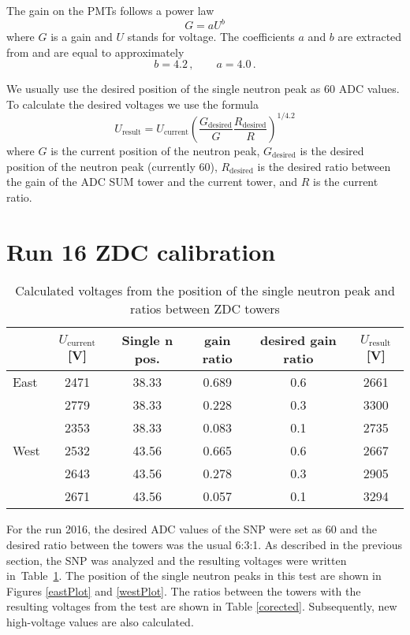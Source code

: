 The gain on the PMTs follows a power law
\begin{equation}
G = aU^b
\end{equation}
where $G$ is a gain and $U$ stands for voltage. The coefficients $a$ and $b$ are 
extracted from \cite{ZDCvoltsDependence}
and are equal to approximately
\begin{equation}
b=4.2\,, \qquad a=4.0\,.
\end{equation}

We usually use the desired position of the single neutron peak as 60 ADC values. To calculate
the desired voltages we use the formula
\begin{equation}
U_{\text{result}} = U_\text{current}\left(\frac{G_\text{desired}}{G} 
\frac{R_\text{desired}}{R}\right)^{1/4.2}
\end{equation}
where $G$ is the current position of the neutron peak, $G_\text{desired}$ is the desired position
of the neutron peak (currently 60), $R_\text{desired}$ is the desired ratio between the gain of the ADC SUM
tower and the current tower, and $R$ is the current ratio.

\section{Run 16 ZDC calibration}

\begin{table}[t] 
\caption{Calculated voltages from the position of the single neutron peak and ratios 
between ZDC towers}
\label{uncorected}
\begin{center}
\begin{tabular}{lccccc}
 \toprule
 &$U_\text{current}$[V]&Single n pos.&gain ratio&desired gain ratio&$U_\text{result}$[V]\\
\midrule
 East&2471&38.33&0.689&0.6&2661\\
     &2779&38.33&0.228&0.3&3300\\
     &2353&38.33&0.083&0.1&2735\\
 \midrule
West&2532&43.56&0.665&0.6&2667\\
    &2643&43.56&0.278&0.3&2905\\
    &2671&43.56&0.057&0.1&3294\\
 \bottomrule
\end{tabular}
\end{center}
\end{table}

For the run 2016, the desired ADC values of the SNP were set as 60 and the desired ratio between the
towers was the usual 6:3:1. As described in the previous section, the SNP was analyzed
and the resulting voltages were written in~Table~\ref{uncorected}. The position of the single
neutron peaks in this test
are shown in Figures \ref{eastPlot} and \ref{westPlot}.
The ratios between the towers with the resulting voltages from the test
are shown in Table \ref{corected}.
Subsequently, new high-voltage values are also calculated.


